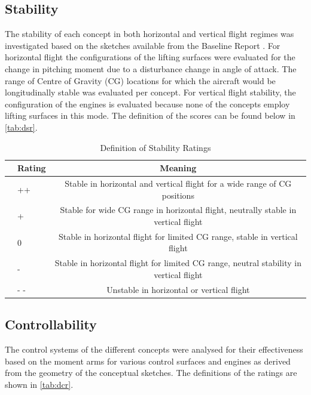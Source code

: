 \subsection{Stability}

The stability of each concept in both horizontal and vertical flight regimes was investigated based on the sketches available from the Baseline Report \cite{baseline}. For horizontal flight the configurations of the lifting surfaces were evaluated for the change in pitching moment due to a disturbance change in angle of attack. The range of Centre of Gravity (CG) locations for which the aircraft would be longitudinally stable was evaluated per concept. For vertical flight stability, the configuration of the engines is evaluated because none of the concepts employ lifting surfaces in this mode. The definition of the scores can be found below in \autoref{tab:dsr}. 

\begin{table}[H]
\centering
\caption{Definition of Stability Ratings}
\label{tab:dsr}
    \begin{tabular}{llc}
        \toprule
            &\textbf{Rating}           & \textbf{Meaning}
        \\ \midrule
          & ++            & Stable in horizontal and vertical flight for a wide range of CG positions          
        \\ \hdashline
          & +               & Stable for wide CG range in horizontal flight, neutrally stable in vertical flight
        \\ \hdashline
          & 0          & Stable in horizontal flight for limited CG range, stable in vertical flight 
        \\ \hdashline
          & -           & Stable in horizontal flight for limited CG range, neutral stability in vertical flight 
        \\ \hdashline
          & - -   & Unstable in horizontal or vertical flight
        \\ \bottomrule
    \end{tabular}
\end{table}

\subsection{Controllability}

The control systems of the different concepts were analysed for their effectiveness based on the moment arms for various control surfaces and engines as derived from the geometry of the conceptual sketches. The definitions of the ratings are shown in \autoref{tab:dcr}.

